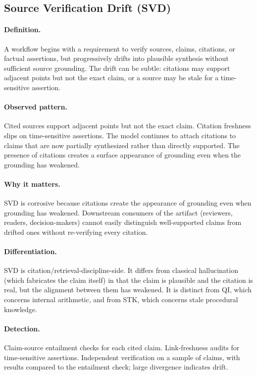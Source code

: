 \documentclass[11pt]{article}
\begin{document}
\subsection{Source Verification Drift (SVD)}
\paragraph{Definition.} A workflow begins with a requirement to verify sources, claims, citations, or factual assertions, but progressively drifts into plausible synthesis without sufficient source grounding. The drift can be subtle: citations may support adjacent points but not the exact claim, or a source may be stale for a time-sensitive assertion.

\paragraph{Observed pattern.} Cited sources support adjacent points but not the exact claim. Citation freshness slips on time-sensitive assertions. The model continues to attach citations to claims that are now partially synthesized rather than directly supported. The presence of citations creates a surface appearance of grounding even when the grounding has weakened.

\paragraph{Why it matters.} SVD is corrosive because citations create the appearance of grounding even when grounding has weakened. Downstream consumers of the artifact (reviewers, readers, decision-makers) cannot easily distinguish well-supported claims from drifted ones without re-verifying every citation.

\paragraph{Differentiation.} SVD is citation/retrieval-discipline-side. It differs from classical hallucination (which fabricates the claim itself) in that the claim is plausible and the citation is real, but the alignment between them has weakened. It is distinct from QI, which concerns internal arithmetic, and from STK, which concerns stale procedural knowledge.

\paragraph{Detection.} Claim-source entailment checks for each cited claim. Link-freshness audits for time-sensitive assertions. Independent verification on a sample of claims, with results compared to the entailment check; large divergence indicates drift.
\end{document}
